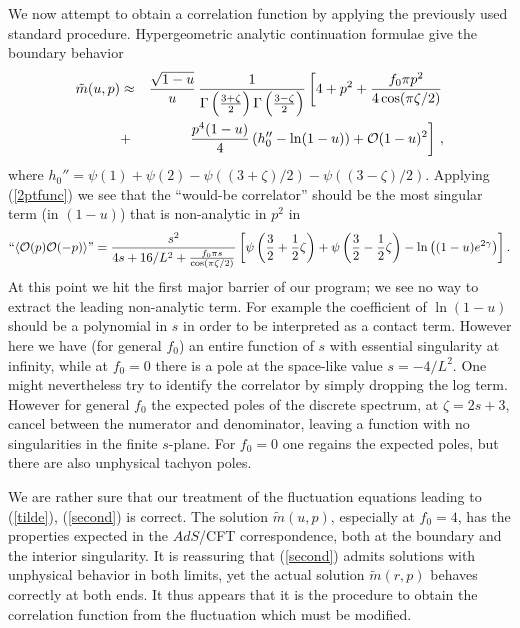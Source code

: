 \documentclass[a4paper,12pt]{article}
\def\mt{\tilde{m}}
\begin{document}
We now attempt to obtain a correlation function by applying the previously used standard procedure.  Hypergeometric analytic continuation formulae \cite{bateman} give the boundary behavior
\begin{eqnarray}
\label{Mboundary}
\mt(u,p) &\approx& \frac{\sqrt{1-u}}{u} \, \frac{1}{\Gamma
\left(\frac{3+ \zeta}{2} \right) \Gamma \left(\frac{3- \zeta}{2} \right)}
\left[ 4+p^2+\frac{f_0 \pi p^2}{4 \cos(\pi \zeta/2)} \right. \\ 
&+& \left. \frac{p^4(1-u)}{4} \left(h_0''- \ln(1-u) \right) + {\cal
O}(1-u)^2 \right] \,, \nonumber
\end{eqnarray}
where $h_0'' = \psi(1) + \psi(2) - \psi((3+\zeta)/2)- \psi((3-\zeta)/2)$.
Applying (\ref{2ptfunc}) we see that the ``would-be correlator''
should be the most singular term (in $(1-u)$) that is non-analytic in
$p^2$ in
\begin{eqnarray}
\label{badcorr} ``\langle{\cal O}(p) {\cal O}(-p)\rangle\mbox{''} = \frac{s^2}{4s + 16/L^2 +
\frac{f_0 \pi s}{\cos(\pi \zeta/2)}} \left[ \psi \left(\frac{3}{2} +
\frac{1}{2} \zeta \right) + \psi \left(\frac{3}{2} - \frac{1}{2} \zeta
\right) - \ln\left((1-u)e^{2 \gamma} \right) \right] .
\end{eqnarray}
At this point we hit the first major barrier of our program; we see no
way to extract the leading non-analytic term.  For example the
coefficient of $\ln(1-u)$ should be a polynomial in $s$ in order to be
interpreted as a contact term.  However here we have (for general
$f_0$) an entire function of $s$ with essential singularity at
infinity, while at $f_0 = 0$ there is a pole at the space-like value
$s = - 4/L^2$.  One might nevertheless try to identify the correlator
by simply dropping the log term.  However for general $f_0$ the
expected poles of the discrete spectrum, at $\zeta = 2s+3$, cancel
between the numerator and denominator, leaving a function with no
singularities in the finite $s$-plane.  For $f_0 = 0$ one regains the
expected poles, but there are also unphysical tachyon poles.

We are rather sure that our treatment of the fluctuation equations
leading to (\ref{tilde}), (\ref{second}) is correct.  The solution
$\mt(u,p)$, especially at $f_0=4$, has the properties expected in the
$AdS$/CFT correspondence, both at the boundary and the interior
singularity.  It is reassuring that (\ref{second}) admits solutions
with unphysical behavior in both limits, yet the actual solution
$\mt(r,p)$ behaves correctly at both ends. It thus appears that it is
the procedure to obtain the correlation function from the fluctuation
which must be modified.
\end{document}
